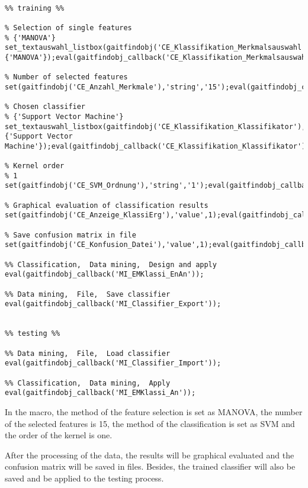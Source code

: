 \begin{lstlisting}[caption={Marcos of the \textsc{ScixMiner}},label=code:scix]

%% training %%

% Selection of single features
% {'MANOVA'}
set_textauswahl_listbox(gaitfindobj('CE_Klassifikation_Merkmalsauswahl'),{'MANOVA'});eval(gaitfindobj_callback('CE_Klassifikation_Merkmalsauswahl'));

% Number of selected features
set(gaitfindobj('CE_Anzahl_Merkmale'),'string','15');eval(gaitfindobj_callback('CE_Anzahl_Merkmale'));

% Chosen classifier
% {'Support Vector Machine'}
set_textauswahl_listbox(gaitfindobj('CE_Klassifikation_Klassifikator'),{'Support Vector Machine'});eval(gaitfindobj_callback('CE_Klassifikation_Klassifikator'));

% Kernel order
% 1
set(gaitfindobj('CE_SVM_Ordnung'),'string','1');eval(gaitfindobj_callback('CE_SVM_Ordnung'));

% Graphical evaluation of classification results
set(gaitfindobj('CE_Anzeige_KlassiErg'),'value',1);eval(gaitfindobj_callback('CE_Anzeige_KlassiErg'));

% Save confusion matrix in file
set(gaitfindobj('CE_Konfusion_Datei'),'value',1);eval(gaitfindobj_callback('CE_Konfusion_Datei'));

%% Classification,  Data mining,  Design and apply 
eval(gaitfindobj_callback('MI_EMKlassi_EnAn'));

%% Data mining,  File,  Save classifier 
eval(gaitfindobj_callback('MI_Classifier_Export'));


%% testing %%

%% Data mining,  File,  Load classifier 
eval(gaitfindobj_callback('MI_Classifier_Import'));

%% Classification,  Data mining,  Apply 
eval(gaitfindobj_callback('MI_EMKlassi_An'));

\end{lstlisting}

In the macro, the method of the feature selection is set as \ac{MANOVA}, the number of the selected features is 15, the method of the classification is set as \ac{SVM} and the order of the kernel is one.

After the processing of the data, the results will be graphical evaluated and the confusion matrix will be saved in files.
Besides, the trained classifier will also be saved and be applied to the testing process.